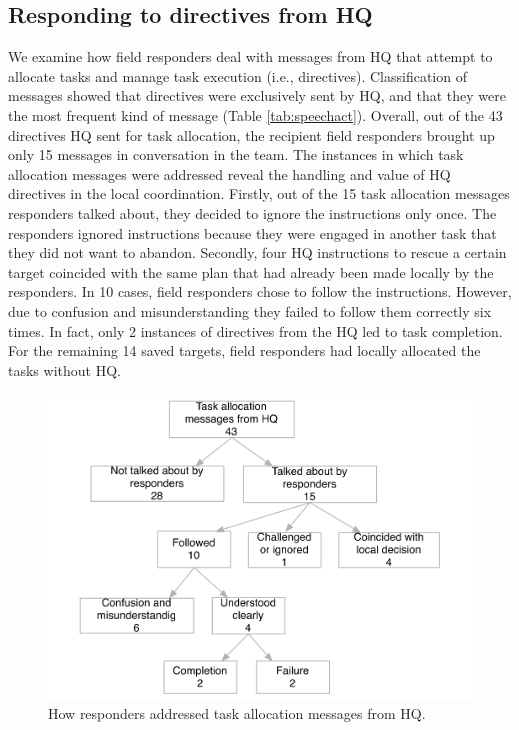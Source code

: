 \subsection{Responding to directives from HQ}\label{sec:study1directives}

We examine how field responders deal with messages from HQ that attempt to allocate tasks and manage task execution (i.e., directives). Classification of messages showed that directives were exclusively sent by HQ, and that they were the most frequent kind of message (Table \ref{tab:speechact}). Overall, out of the 43 directives HQ sent for task allocation, the recipient field responders brought up only 15 messages in conversation in the team. The instances in which task allocation messages were addressed reveal the handling and value of HQ directives in the local coordination. Firstly, out of the 15 task allocation messages responders talked about, they decided to ignore the instructions only once. The responders ignored instructions because they were engaged in another task that they did not want to abandon. Secondly, four HQ instructions to rescue a certain target coincided with the same plan that had already been made locally by the responders. In 10 cases, field responders chose to follow the instructions. However, due to confusion and misunderstanding they failed to follow them correctly six times. In fact, only 2 instances of directives from the HQ led to task completion. For the remaining 14 saved targets, field responders had locally allocated the tasks without HQ.\\

\begin{figure}[h]
  \centering
  \includegraphics[width=1\textwidth]{img/study1/instructions}
  \caption{How responders addressed task allocation messages from HQ.}
  \label{fig:instructions}
\end{figure}

